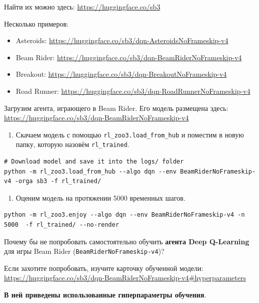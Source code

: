 \documentclass[11pt,a4paper]{article}
\begin{document}
Найти их можно здесь: \url{https://huggingface.co/sb3}

Несколько примеров:

\begin{itemize}
\tightlist
\item
Asteroids: \url{https://huggingface.co/sb3/dqn-AsteroidsNoFrameskip-v4}
\item
Beam Rider: \url{https://huggingface.co/sb3/dqn-BeamRiderNoFrameskip-v4}
\item
Breakout: \url{https://huggingface.co/sb3/dqn-BreakoutNoFrameskip-v4}
\item
Road Runner: \url{https://huggingface.co/sb3/dqn-RoadRunnerNoFrameskip-v4}
\end{itemize}

Загрузим агента, играющего в Beam Rider. Его модель размещена здесь: \url{https://huggingface.co/sb3/dqn-BeamRiderNoFrameskip-v4}

\begin{enumerate}
\def\labelenumi{\arabic{enumi}.}
\tightlist
\item
Скачаем модель с помощью \texttt{rl\_zoo3.load\_from\_hub} и поместим в новую папку, которую назовём \texttt{rl\_trained}.
\end{enumerate}

\begin{lstlisting}
# Download model and save it into the logs/ folder
python -m rl_zoo3.load_from_hub --algo dqn --env BeamRiderNoFrameskip-v4 -orga sb3 -f rl_trained/
\end{lstlisting}

\begin{enumerate}
\def\labelenumi{\arabic{enumi}.}
\setcounter{enumi}{1}
\tightlist
\item
Оценим модель на протяжении 5000 временных шагов.
\end{enumerate}

\begin{lstlisting}
python -m rl_zoo3.enjoy --algo dqn --env BeamRiderNoFrameskip-v4 -n 5000  -f rl_trained/ --no-render
\end{lstlisting}

Почему бы не попробовать самостоятельно обучить \textbf{агента Deep Q-Learning} для игры Beam Rider (\texttt{BeamRiderNoFrameskip-v4})?

Если захотите попробовать, изучите карточку обученной модели: \url{https://huggingface.co/sb3/dqn-BeamRiderNoFrameskip-v4#hyperparameters}\par\noindent \textbf{В ней приведены использованные гиперпараметры обучения}.
\end{document}

